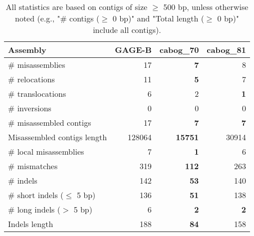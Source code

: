 \documentclass[12pt,a4paper]{article}
\begin{document}
\begin{table}[ht]
\begin{center}
\caption{All statistics are based on contigs of size $\geq$ 500 bp, unless otherwise noted (e.g., "\# contigs ($\geq$ 0 bp)" and "Total length ($\geq$ 0 bp)" include all contigs).}
\begin{tabular}{|l*{3}{|r}|}
\hline
Assembly & GAGE-B & cabog\_70 & cabog\_81 \\ \hline
\# misassemblies & 17 & {\bf 7} & 8 \\ \hline
\hspace{5mm}\# relocations & 11 & {\bf 5} & 7 \\ \hline
\hspace{5mm}\# translocations & 6 & 2 & {\bf 1} \\ \hline
\hspace{5mm}\# inversions & 0 & 0 & 0 \\ \hline
\# misassembled contigs & 17 & {\bf 7} & {\bf 7} \\ \hline
Misassembled contigs length & 128064 & {\bf 15751} & 30914 \\ \hline
\# local misassemblies & 7 & {\bf 1} & 6 \\ \hline
\# mismatches & 319 & {\bf 112} & 263 \\ \hline
\# indels & 142 & {\bf 53} & 140 \\ \hline
\hspace{5mm}\# short indels ($\leq$ 5 bp) & 136 & {\bf 51} & 138 \\ \hline
\hspace{5mm}\# long indels ($>$ 5 bp) & 6 & {\bf 2} & {\bf 2} \\ \hline
Indels length & 188 & {\bf 84} & 158 \\ \hline
\end{tabular}
\end{center}
\end{table}
\end{document}
